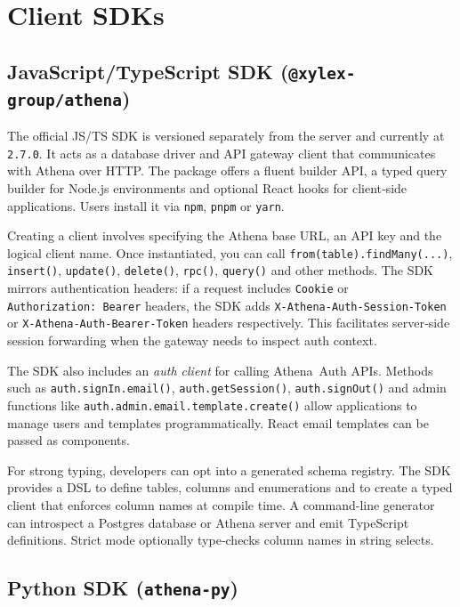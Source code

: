\documentclass[11pt,a4paper]{article}
\begin{document}
\section{Client SDKs}

\subsection{JavaScript/TypeScript SDK (\texttt{@xylex-group/athena})}

The official JS/TS SDK is versioned separately from the server and currently at \texttt{2.7.0}.  It acts as a database driver and API gateway client that communicates with Athena over HTTP.  The package offers a fluent builder API, a typed query builder for Node.js environments and optional React hooks for client‑side applications.  Users install it via \texttt{npm}, \texttt{pnpm} or \texttt{yarn}.

Creating a client involves specifying the Athena base URL, an API key and the logical client name.  Once instantiated, you can call \texttt{from(table).findMany({...})}, \texttt{insert()}, \texttt{update()}, \texttt{delete()}, \texttt{rpc()}, \texttt{query()} and other methods.  The SDK mirrors authentication headers: if a request includes \texttt{Cookie} or \texttt{Authorization: Bearer} headers, the SDK adds \texttt{X‑Athena‑Auth‑Session‑Token} or \texttt{X‑Athena‑Auth‑Bearer‑Token} headers respectively.  This facilitates server‑side session forwarding when the gateway needs to inspect auth context.

The SDK also includes an \emph{auth client} for calling Athena Auth APIs.  Methods such as \texttt{auth.signIn.email()}, \texttt{auth.getSession()}, \texttt{auth.signOut()} and admin functions like \texttt{auth.admin.email.template.create()} allow applications to manage users and templates programmatically.  React email templates can be passed as components.

For strong typing, developers can opt into a generated schema registry.  The SDK provides a DSL to define tables, columns and enumerations and to create a typed client that enforces column names at compile time.  A command-line generator can introspect a Postgres database or Athena server and emit TypeScript definitions.  Strict mode optionally type‑checks column names in string selects.

\subsection{Python SDK (\texttt{athena-py})}
\end{document}

